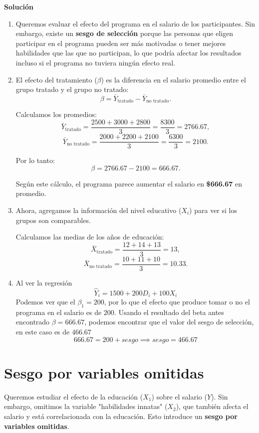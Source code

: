 \documentclass[10pt,a4paper]{article}
\begin{document}
\textbf{Solución}
\begin{enumerate}
    \item Queremos evaluar el efecto del programa en el salario de los participantes. Sin embargo, existe un \textbf{sesgo de selección} porque las personas que eligen participar en el programa pueden ser más motivadas o tener mejores habilidades que las que no participan, lo que podría afectar los resultados incluso si el programa no tuviera ningún efecto real.

    \item El efecto del tratamiento (\( \beta \)) es la diferencia en el salario promedio entre el grupo tratado y el grupo no tratado:
\[
\beta = \bar{Y}_{\text{tratado}} - \bar{Y}_{\text{no tratado}}.
\]

Calculamos los promedios:
\[
\bar{Y}_{\text{tratado}} = \frac{2500 + 3000 + 2800}{3} = \frac{8300}{3} = 2766.67,
\]
\[
\bar{Y}_{\text{no tratado}} = \frac{2000 + 2200 + 2100}{3} = \frac{6300}{3} = 2100.
\]

Por lo tanto:
\[
\beta = 2766.67 - 2100 = 666.67.
\]

Según este cálculo, el programa parece aumentar el salario en \textbf{\$666.67} en promedio.

\item Ahora, agregamos la información del nivel educativo (\( X_i \)) para ver si los grupos son comparables.

Calculamos las medias de los años de educación:
\[
\bar{X}_{\text{tratado}} = \frac{12 + 14 + 13}{3} = 13,
\]
\[
\bar{X}_{\text{no tratado}} = \frac{10 + 11 + 10}{3} = 10.33.
\]

\item Al ver la regresión
$$\hat{Y}_i = 1500+200D_i + 100X_i$$
Podemos ver que el $\beta_1=200$, por lo que el efecto que produce tomar o no el programa en el salario es de $200$. Usando el resultado del beta antes encontrado $\beta = 666.67$, podemos encontrar que el valor del sesgo de selección, en este caso es de $466.67$
$$666.67 = 200 + sesgo \implies sesgo = 466.67$$
\end{enumerate}



\section{Sesgo por variables omitidas}
Queremos estudiar el efecto de la educación (\( X_1 \)) sobre el salario (\( Y \)). Sin embargo, omitimos la variable "habilidades innatas" (\( X_2 \)), que también afecta el salario y está correlacionada con la educación. Esto introduce un \textbf{sesgo por variables omitidas}.
\end{document}

